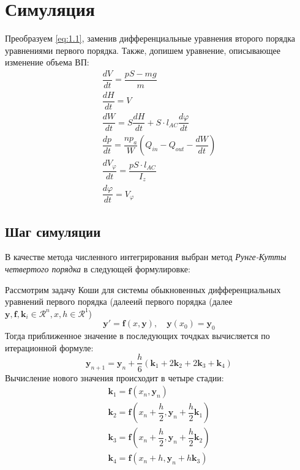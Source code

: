 \documentclass{article}%
\numberwithin{equation}{subsection}
\let\oldsection\section%
\renewcommand{\section}{%
  \renewcommand{\theequation}{\thesection.\arabic{equation}}%
  \oldsection}%
\let\oldsubsection\subsection%
\renewcommand{\subsection}{%
  \renewcommand{\theequation}{\thesubsection.\arabic{equation}}%
  \oldsubsection}%
\begin{document}
\section{Симуляция}
Преобразуем \ref{eq:1.1}, заменив дифференциальные уравнения второго порядка уравнениями первого порядка. Также, допишем уравнение, описывающее изменение объема ВП:
\begin{equation}
\begin{gathered}
    \dfrac{dV}{dt}=\dfrac{pS-mg}{m}\\
    \dfrac{dH}{dt} = V\\
    \dfrac{dW}{dt}=S\dfrac{dH}{dt}+S\cdot l_{AC}\dfrac{d\varphi}{dt}\\
    \dfrac{dp}{dt}=\dfrac{np_a}{W}\left(Q_{in} - Q_{out} -\dfrac{dW}{dt}\right)\\
    \dfrac{dV_{\varphi}}{dt}=\dfrac{pS\cdot l_{AC}}{I_z}\\
    \dfrac{d\varphi}{dt} = V_{\varphi}
\end{gathered}
\end{equation}

\subsection{Шаг симуляции}
В качестве метода численного интегрирования выбран метод {\it Рунге-Кутты четвертого порядка} в следующей формулировке:
\newline\par
Рассмотрим задачу Коши для системы обыкновенных дифференциальных уравнений первого порядка (далееий первого порядка (далее $\mathbf{y}, \mathbf{f}, \mathbf{k}_i \in \mathcal{R}^n, x, h \in \mathcal{R}^1$)
\begin{equation}
    \mathbf{y}'=\mathbf{f}(x, \mathbf{y}), \quad \mathbf{y}(x_0)=\mathbf{y}_0
\end{equation}
Тогда приближенное значение в последующих точдках вычисляется по итерационной формуле:
\begin{equation}
    \mathbf{y}_{n+1}=\mathbf{y}_n + \dfrac{h}{6}(\mathbf{k}_1 + 2\mathbf{k}_2 + 2\mathbf{k}_3 + \mathbf{k}_4)
\end{equation}
Вычисление нового значения происходит в четыре стадии:
\begin{equation}
\begin{gathered}
    \mathbf{k}_1 = \mathbf{f}(x_n, \mathbf{y}_n)\\
    \mathbf{k}_2 = \mathbf{f}(x_n + \dfrac{h}{2}, \mathbf{y}_n + \dfrac{h}{2}\mathbf{k}_1)\\
    \mathbf{k}_3 = \mathbf{f}(x_n + \dfrac{h}{2}, \mathbf{y}_n + \dfrac{h}{2}\mathbf{k}_2)\\
    \mathbf{k}_4 = \mathbf{f}(x_n + h, \mathbf{y}_n + h\mathbf{k}_3)
\end{gathered}
\end{equation}
\end{document}
